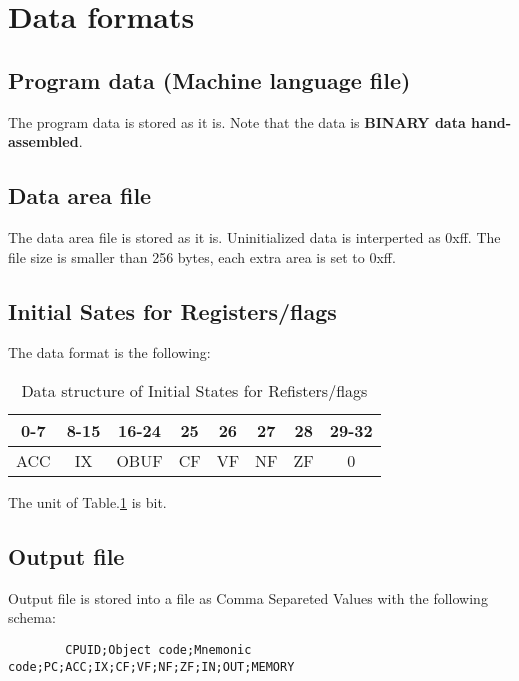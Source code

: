 \documentclass[a4paper]{article}
\begin{document}
    \section{Data formats}
        \subsection{Program data (Machine language file)}
        The program data is stored as it is. Note that the data is {\bf BINARY data hand-assembled}.
        
        \subsection{Data area file}
        The data area file is stored as it is. Uninitialized data is interperted as 0xff. The file size is smaller than 256 bytes, each extra area is set to 0xff.
        
        \subsection{Initial Sates for Registers/flags}
        The data format is the following:
        
        \begin{table}[htb]
                \begin{center}
                    \caption{Data structure of Initial States for Refisters/flags \label{structure}}
                    \begin{tabular}{|c|c|c|c|c|c|c|c|}
                        \hline0-7&8-15&16-24&25&26&27&28&29-32\\
                        \hline ACC&IX&OBUF&CF&VF&NF&ZF&0\\
                        \hline
                    \end{tabular}
                \end{center}
        \end{table}
        
        The unit of Table.\ref{structure} is bit.
        
        \subsection{Output file}
        Output file is stored into a file as Comma Separeted Values with the following schema:
        \begin{verbatim}
        CPUID;Object code;Mnemonic code;PC;ACC;IX;CF;VF;NF;ZF;IN;OUT;MEMORY
        \end{verbatim}
\end{document}
